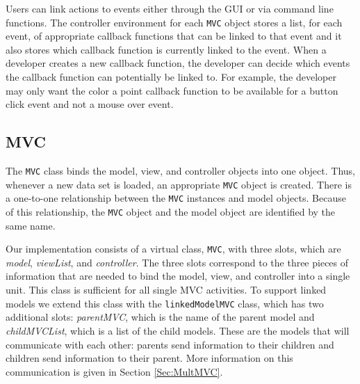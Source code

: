 \documentclass[11pt]{article}
\newcommand{\Robject}[1]{{\texttt{#1}}}
\newcommand{\Rslot}[1]{\textsl{#1}}
\newcommand{\Rclass}[1]{\texttt{#1}}
\begin{document}
Users can link actions to events either through the GUI or via
command line functions.  The controller environment for each \Robject{MVC}
object stores a list, for each event, of appropriate callback functions that
can be linked to that event and it also stores which callback function is
currently linked to the event.  When a developer creates a new callback
function, the developer can decide which events the callback function can
potentially be linked to.  For example, the developer may only want the color
a point callback function to be available for a button click event and not a
mouse over event.

\subsection{MVC}
\label{Ssec:OneMVC}
 
The \Rclass{MVC} class binds the model, view, and controller objects
into one object.  Thus, whenever a new data set is loaded, an
appropriate \Robject{MVC} object is created.  There is a one-to-one
relationship between the \Robject{MVC} instances and model objects.
Because of this relationship, the \Robject{MVC} object and the model
object are identified by the same name.

Our implementation consists
of a virtual class, \Rclass{MVC}, with three slots, which are
\Rslot{model}, \Rslot{viewList}, and \Rslot{controller}. The three
slots correspond to the three pieces of information that are needed to
bind the model, view, and controller into a single unit. This class is
sufficient for all single MVC activities. To support linked models
we extend this class with the \Rclass{linkedModelMVC} class, which has
two additional slots: \Rslot{parentMVC}, which is the name of the
parent model and \Rslot{childMVCList}, which is a list of the child models.
These are the models that will communicate with each other: parents send
information to their children and children send information to their parent.
More information on this communication is given in Section \ref{Sec:MultMVC}.
\end{document}
